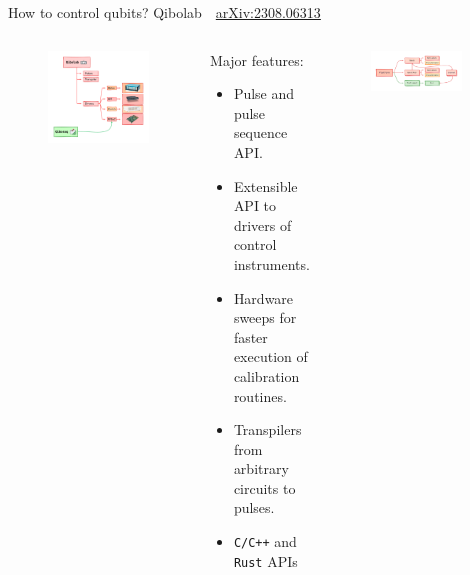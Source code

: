 \documentclass[aspectratio=169, 8pt, xcolor={svgnames}, hyperref={linkcolor=black}]{beamer}
\begin{document}
\begin{frame}{How to control qubits? Qibolab  \hfill \faBook\,\, \href{https://arxiv.org/abs/2308.06313}{arXiv:2308.06313}}
   \small
   \begin{columns}
     \column{6.5cm}

   \begin{figure}
     \includegraphics[width=\textwidth]{figures/instruments.pdf}
   \end{figure}

     \column{9cm}
     \begin{alertblock}{Major features:}
       \begin{itemize}
         \item Pulse and pulse sequence API.
         \item Extensible API to drivers of control instruments.
         \item Hardware sweeps for faster execution of calibration routines.
         \item Transpilers from arbitrary circuits to pulses.
         \item \texttt{C/C++} and \texttt{Rust} APIs
       \end{itemize}
     \end{alertblock}
     \begin{figure}
       \includegraphics[width=0.9\textwidth]{figures/platform_object.pdf}
     \end{figure}
   \end{columns}

 \end{frame}
\end{document}
